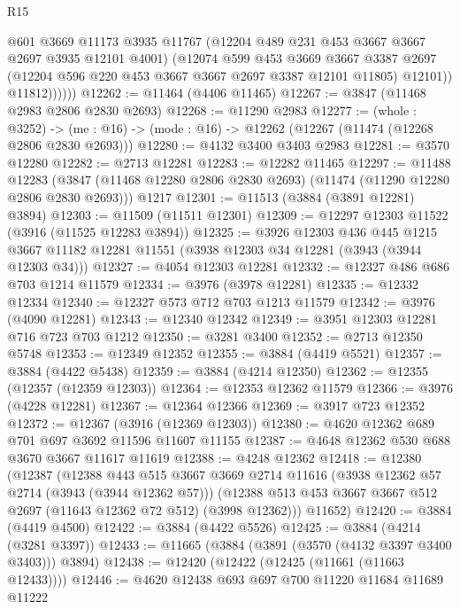 \begin{lexlean}{R15}
\begin{coremodule}
                  @601
                  @3669
                  @11173
                  @3935
                  @11767
                  (@12204 @489 @231 @453 @3667 @3667 @2697 @3935 @12101 @4001)
                  (@12074
                    @599
                    @453
                    @3669
                    @3667
                    @3387
                    @2697
                    (@12204 @596 @220 @453 @3667 @3667 @2697 @3387 @12101 @11805)
                    @12101))
                @11812))))))
@12262 := @11464 (@4406 @11465)
@12267 := @3847 (@11468 @2983 @2806 @2830 @2693)
@12268 := @11290 @2983
@12277 := (whole : @3252) ->
  (me : @16) -> (mode : @16) -> @12262 (@12267 (@11474 (@12268 @2806 @2830 @2693)))
@12280 := @4132 @3400 @3403 @2983
@12281 := @3570 @12280
@12282 := @2713 @12281
@12283 := @12282 @11465
@12297 := @11488
    @12283
    (@3847 (@11468 @12280 @2806 @2830 @2693) (@11474 (@11290 @12280 @2806 @2830 @2693)))
    @1217
@12301 := @11513 (@3884 (@3891 @12281) @3894)
@12303 := @11509 (@11511 @12301)
@12309 := @12297 @12303 @11522 (@3916 (@11525 @12283 @3894))
@12325 := @3926
    @12303
    @436
    @445
    @1215
    @3667
    @11182
    @12281
    @11551
    (@3938 @12303 @34 @12281 (@3943 (@3944 @12303 @34)))
@12327 := @4054 @12303 @12281
@12332 := @12327 @486 @686 @703 @1214 @11579
@12334 := @3976 (@3978 @12281)
@12335 := @12332 @12334
@12340 := @12327 @573 @712 @703 @1213 @11579
@12342 := @3976 (@4090 @12281)
@12343 := @12340 @12342
@12349 := @3951 @12303 @12281 @716 @723 @703 @1212
@12350 := @3281 @3400
@12352 := @2713 @12350 @5748
@12353 := @12349 @12352
@12355 := @3884 (@4419 @5521)
@12357 := @3884 (@4422 @5438)
@12359 := @3884 (@4214 @12350)
@12362 := @12355 (@12357 (@12359 @12303))
@12364 := @12353 @12362 @11579
@12366 := @3976 (@4228 @12281)
@12367 := @12364 @12366
@12369 := @3917 @723 @12352
@12372 := @12367 (@3916 (@12369 @12303))
@12380 := @4620 @12362 @689 @701 @697 @3692 @11596 @11607 @11155
@12387 := @4648 @12362 @530 @688 @3670 @3667 @11617 @11619
@12388 := @4248 @12362
@12418 := @12380
    (@12387
      (@12388
        @443
        @515
        @3667
        @3669
        @2714
        @11616
        (@3938 @12362 @57 @2714 (@3943 (@3944 @12362 @57)))
        (@12388 @513 @453 @3667 @3667 @512 @2697 (@11643 @12362 @72 @512) (@3998 @12362)))
      @11652)
@12420 := @3884 (@4419 @4500)
@12422 := @3884 (@4422 @5526)
@12425 := @3884 (@4214 (@3281 @3397))
@12433 := @11665 (@3884 (@3891 (@3570 (@4132 @3397 @3400 @3403))) @3894)
@12438 := @12420 (@12422 (@12425 (@11661 (@11663 @12433))))
@12446 := @4620 @12438 @693 @697 @700 @11220 @11684 @11689 @11222

\end{coremodule}
\end{lexlean}

